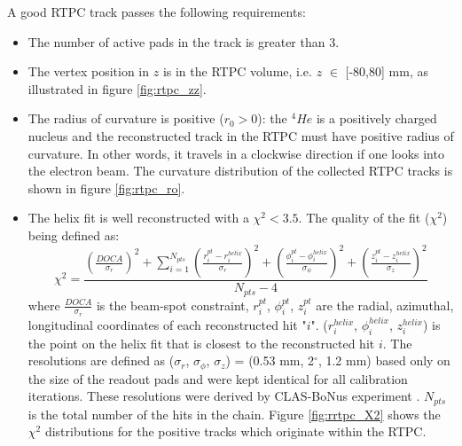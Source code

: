 A good RTPC track passes the following requirements:
\begin{itemize}
\item The number of active pads in the track is greater than 3. 

\item The vertex position in $z$ is in the RTPC volume, i.e. $z$ $\in$ [-80,80] mm, as 
   illustrated in figure \ref{fig:rtpc_zz}.  

\item The radius of curvature is positive ($r_{0}>0$): the $^4He$ is a positively 
   charged nucleus and the reconstructed track in the RTPC must have positive 
   radius of curvature. In other words, it travels in a clockwise direction if 
   one looks into the electron beam. The curvature distribution of the 
   collected RTPC tracks is shown in figure \ref{fig:rtpc_ro}.

\item The helix fit is well reconstructed with a $\chi^{2} < 3.5$. The 
   quality of the fit ($\chi^{2}$) being defined as:
\begin{equation}
   \chi^{2} = \frac{\displaystyle \left(\frac{DOCA}{\sigma_r}\right)^2 
       + \sum_{i = 1}^{ N_{pts}} \left(\frac{r^{pt}_{i} 
      - r^{helix}_{i} }{\sigma_{r}}\right)^{2}  + \left( \frac{\phi^{pt}_{i} - 
      \phi^{helix}_{i} }{\sigma_{\phi}}\right)^{2} + \left( \frac{z^{pt}_{i} - 
   z^{helix}_{i} }{\sigma_{z} } \right)^{2}}{N_{pts} - 4}
\end{equation}
where $\frac{DOCA}{\sigma_r}$ is the beam-spot constraint, $r^{pt}_{i}$, 
$\phi^{pt}_{i}$, $z^{pt}_{i}$ are the radial, azimuthal, longitudinal 
coordinates of each reconstructed hit "$i$". ($r^{helix}_{i}$,
$\phi^{helix}_{i}$, $z^{helix}_{i}$) is the point on the helix fit that is 
closest to the reconstructed hit $i$. The resolutions 
are defined as ($\sigma_{r}$, $\sigma_{\phi}$, $\sigma_{z}$) = (0.53 mm, 
2$^{\circ}$, 1.2 mm) based only on the size
of the readout pads and were kept identical for all calibration iterations. These 
resolutions were derived by CLAS-BoNus experiment \cite{BONUS}. $N_{pts}$ is 
the total number of the hits in the chain. Figure \ref{fig:rrtpc_X2} shows the 
$\chi^{2}$ distributions for the positive tracks which originate within the 
RTPC.


\end{itemize}
